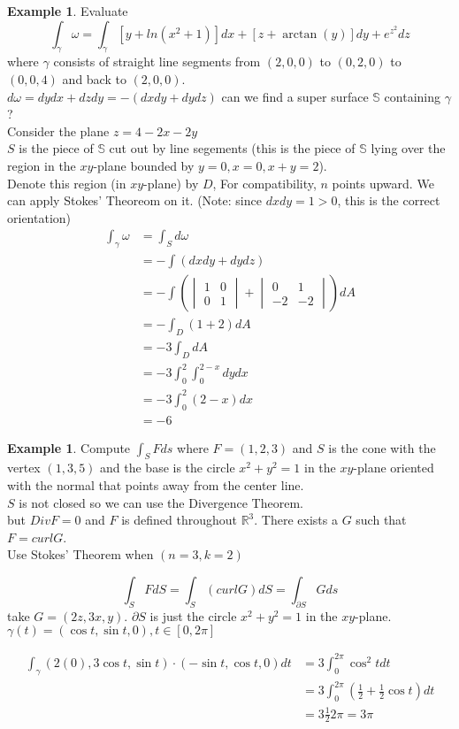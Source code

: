 \documentclass[12pt]{article}
\theoremstyle{plain}
\theoremstyle{definition}
\newtheorem{example}[theorem]{Example}
\begin{document}
\begin{example}
	Evaluate
	$$\int_\gamma \omega = \int_\gamma [y + ln(x^2 + 1)]dx + [z + \arctan(y)]dy + e^{z^2} dz$$
	where $\gamma$ consists of straight line segments from $(2,0,0)$ to $(0,2,0)$ to $(0,0,4)$ and back to $(2,0,0)$.\\
	$d\omega = dydx + dzdy = - (dxdy + dydz)$
	can we find a super surface $\mathbb{S}$ containing $\gamma$?\\

	Consider the plane $z=4-2x-2y$\\
	$S$ is the piece of $\mathbb{S}$ cut out by line segements (this is the piece of $\mathbb{S}$ lying over the region in the $xy$-plane bounded by $y=0, x=0, x+y=2$).\\
	Denote this region (in $xy$-plane) by $D$, For compatibility, $n$ points upward. We can apply Stokes' Theoreom on it. (Note: since $dxdy = 1 > 0$, this is the correct orientation)
	\begin{align*}
		\int_\gamma \omega &= \int_S d\omega\\
		&= -\int (dxdy+dydz)\\
		&= -\int (\begin{vmatrix}
1 & 0 \\
0 & 1
\end{vmatrix} + \begin{vmatrix}
0 & 1 \\
-2 & -2
\end{vmatrix})dA\\
&= -\int_D (1+2)dA\\
&= -3\int_D dA\\
&= -3\int^2_0 \int^{2-x}_0 dydx\\
&= -3\int^2_0 (2-x)dx\\
&= -6
	\end{align*}
\end{example}

\begin{example}
	Compute $\int_S Fds$ where $F=(1,2,3)$ and $S$ is the cone with the vertex $(1,3,5)$ and the base is the circle $x^2+y^2 = 1$ in the $xy$-plane oriented with the normal that points away from the center line.\\
	$S$ is not closed so we can use the Divergence Theorem.\\
	but $Div F = 0$ and $F$ is defined throughout $\mathbb{R}^3$. There exists a $G$ such that $F = curl G$.\\
	Use Stokes' Theorem when $(n=3, k=2)$

	$$\int_S F dS = \int_S (curl G)dS = \int_{\partial S} G ds$$
	take $G = (2z, 3x, y)$. $\partial S$ is just the circle $x^2 + y^2 = 1$ in the $xy$-plane. $\gamma (t) = (\cos t, \sin t, 0), t \in [0,2\pi]$

	\begin{align*}
		\int_\gamma (2(0), 3\cos t, \sin t) \cdot (-\sin t, \cos t, 0)dt &=  3\int^{2\pi}_0 \cos^2 t dt\\
		&= 3\int^{2\pi}_0 (\frac{1}{2} +  \frac{1}{2} \cos t)dt\\
		&= 3 \frac{1}{2} 2\pi = 3\pi
	\end{align*}
\end{example}
\end{document}
